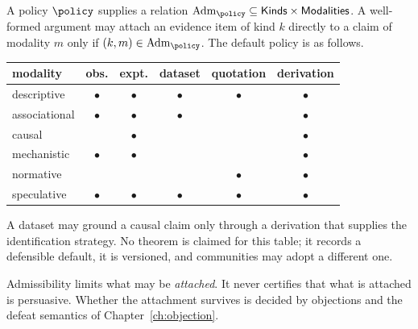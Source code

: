 \begin{designrule}\label{rule:admissibility}
A policy $\policy$ supplies a relation $\mathrm{Adm}_\policy\subseteq\mathsf{Kinds}\times\mathsf{Modalities}$. A well-formed argument may attach an evidence item of kind $k$ directly to a claim of modality $m$ only if $(k,m)\in\mathrm{Adm}_\policy$. The default policy is as follows.
\begin{center}
\begin{tabular}{@{}lccccc@{}}
\toprule
modality & obs. & expt. & dataset & quotation & derivation\\
\midrule
descriptive & $\bullet$ & $\bullet$ & $\bullet$ & $\bullet$ & $\bullet$\\
associational & $\bullet$ & $\bullet$ & $\bullet$ & & $\bullet$\\
causal & & $\bullet$ & & & $\bullet$\\
mechanistic & $\bullet$ & $\bullet$ & & & $\bullet$\\
normative & & & & $\bullet$ & $\bullet$\\
speculative & $\bullet$ & $\bullet$ & $\bullet$ & $\bullet$ & $\bullet$\\
\bottomrule
\end{tabular}
\end{center}
A dataset may ground a causal claim only through a derivation that supplies the identification strategy. No theorem is claimed for this table; it records a defensible default, it is versioned, and communities may adopt a different one.
\end{designrule}

Admissibility limits what may be \emph{attached}. It never certifies that what is attached is persuasive. Whether the attachment survives is decided by objections and the defeat semantics of Chapter~\ref{ch:objection}.
